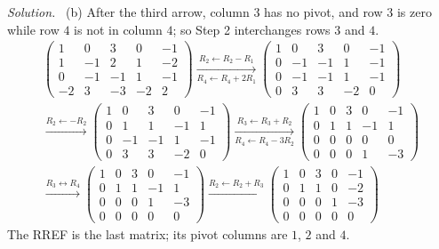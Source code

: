 \documentclass[12pt]{article}
\theoremstyle{definition}
\newenvironment{solution}{\par\noindent\textit{Solution.}\ }{\par\smallskip}
\begin{document}
\begin{solution}
(b) After the third arrow, column \(3\) has no pivot, and row \(3\) is zero while row \(4\) is not in column \(4\);
so Step 2 interchanges rows \(3\) and \(4\).
\[
\begin{gathered}
\begin{pmatrix}1&0&3&0&-1\\1&-1&2&1&-2\\0&-1&-1&1&-1\\-2&3&-3&-2&2\end{pmatrix}
\xrightarrow[R_4\leftarrow R_4+2R_1]{R_2\leftarrow R_2-R_1}
\begin{pmatrix}1&0&3&0&-1\\0&-1&-1&1&-1\\0&-1&-1&1&-1\\0&3&3&-2&0\end{pmatrix}
\\
\xrightarrow{R_2\leftarrow-R_2}
\begin{pmatrix}1&0&3&0&-1\\0&1&1&-1&1\\0&-1&-1&1&-1\\0&3&3&-2&0\end{pmatrix}
\xrightarrow[R_4\leftarrow R_4-3R_2]{R_3\leftarrow R_3+R_2}
\begin{pmatrix}1&0&3&0&-1\\0&1&1&-1&1\\0&0&0&0&0\\0&0&0&1&-3\end{pmatrix}
\\
\xrightarrow{R_3\leftrightarrow R_4}
\begin{pmatrix}1&0&3&0&-1\\0&1&1&-1&1\\0&0&0&1&-3\\0&0&0&0&0\end{pmatrix}
\xrightarrow{R_2\leftarrow R_2+R_3}
\begin{pmatrix}1&0&3&0&-1\\0&1&1&0&-2\\0&0&0&1&-3\\0&0&0&0&0\end{pmatrix}
\end{gathered}
\]
The RREF is the last matrix; its pivot columns are \(1\), \(2\) and \(4\).
\end{solution}
\end{document}
